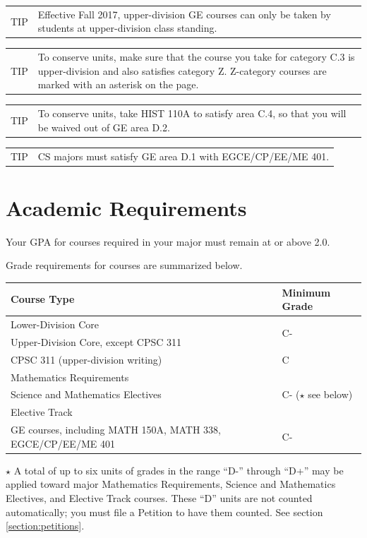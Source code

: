 \documentclass{book}
\newenvironment{tip}{
  \tcolorbox \begin{tabular}{m{.5in} m{5.25in}}
    \Large{TIP} &
}{
  \end{tabular} \endtcolorbox
}
\begin{document}
\begin{tip}
Effective Fall 2017, upper-division GE courses can only be taken by students at
upper-division class standing.
\end{tip}

\begin{tip}
To conserve units, make sure that the course you take for category C.3 is upper-division and also satisfies category Z. Z-category courses are marked with an asterisk on the \gecourselist page.
\end{tip}

\begin{tip}
  To conserve units, take HIST 110A to satisfy area C.4, so that you will be waived out of GE area D.2.
  \end{tip}

\begin{tip}
CS majors must satisfy GE area D.1 with EGCE/CP/EE/ME 401.
\end{tip}

\section{Academic Requirements}

Your GPA for courses required in your major must remain at or above 2.0.

Grade requirements for courses are summarized below.

\begin{center}
\begin{tabular}{|l|l|} \hline
  \textbf{Course Type} & \textbf{Minimum Grade} \\ \hline
  Lower-Division Core & \multirow{2}{*}{C-} \\
  Upper-Division Core, except CPSC 311 & \\ \hline
  CPSC 311 (upper-division writing) & C \\ \hline
  Mathematics Requirements & \multirow{3}{*}{C- ($\star$ see below)} \\
  Science and Mathematics Electives & \\
  Elective Track & \\ \hline
  GE courses, including MATH 150A, MATH 338, EGCE/CP/EE/ME 401 & C- \\ \hline
\end{tabular}
\end{center}

$\star$ A total of up to six units of grades in the range ``D-'' through ``D+'' may be applied toward major Mathematics Requirements, Science and Mathematics Electives, and Elective Track courses. These ``D'' units are not counted automatically; you must file a Petition to have them counted. See section \ref{section:petitions}.
\end{document}
